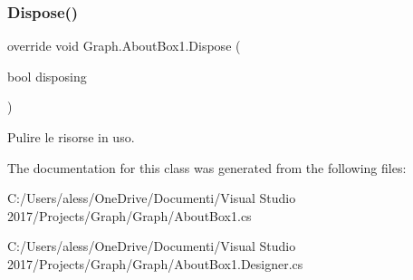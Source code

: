 \subsubsection{\texorpdfstring{Dispose()}{Dispose()}}
{\footnotesize\ttfamily override void Graph.\+About\+Box1.\+Dispose (\begin{DoxyParamCaption}\item[{bool}]{disposing }\end{DoxyParamCaption})\hspace{0.3cm}{\ttfamily [protected]}}



Pulire le risorse in uso. 



The documentation for this class was generated from the following files\+:\begin{DoxyCompactItemize}
\item 
C\+:/\+Users/aless/\+One\+Drive/\+Documenti/\+Visual Studio 2017/\+Projects/\+Graph/\+Graph/About\+Box1.\+cs\item 
C\+:/\+Users/aless/\+One\+Drive/\+Documenti/\+Visual Studio 2017/\+Projects/\+Graph/\+Graph/About\+Box1.\+Designer.\+cs\end{DoxyCompactItemize}
